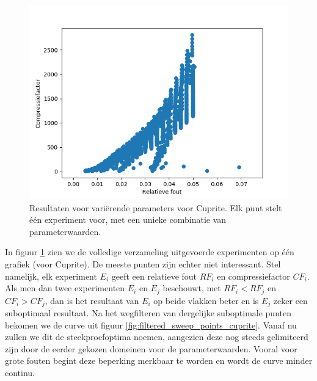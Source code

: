 \begin{figure}[H]
  \centering
  \includegraphics[scale=0.7]{images/all_sweep_points_cuprite.png}
  \caption{Resultaten voor vari\"erende parameters voor Cuprite. Elk punt stelt \'e\'en experiment voor, met een unieke combinatie van parameterwaarden.}
  \label{fig:all_sweep_points_cuprite}
\end{figure}

In figuur \ref{fig:all_sweep_points_cuprite} zien we de volledige verzameling uitgevoerde experimenten op \'e\'en grafiek (voor Cuprite). De meeste punten zijn echter niet interessant. Stel namelijk, elk experiment $E_i$ geeft een relatieve fout $RF_i$ en compressiefactor $CF_i$. Als men dan twee experimenten $E_i$ en $E_j$ beschouwt, met $RF_i < RF_j$ en $CF_i > CF_j$, dan is het resultaat van $E_i$ op beide vlakken beter en is $E_j$ zeker een suboptimaal resultaat. Na het wegfilteren van dergelijke suboptimale punten bekomen we de curve uit figuur \ref{fig:filtered_sweep_points_cuprite}. Vanaf nu zullen we dit de steekproefoptima noemen, aangezien deze nog steeds gelimiteerd zijn door de eerder gekozen domeinen voor de parameterwaarden. Vooral voor grote fouten begint deze beperking merkbaar te worden en wordt de curve minder continu.

